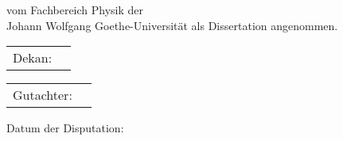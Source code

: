 \thispagestyle{empty}
\vspace*{0.5\textheight}

\noindent{}%
vom Fachbereich Physik der \\[2pt]
Johann Wolfgang Goethe-Universit\"at als Dissertation angenommen.

\vspace*{2cm}

\noindent{}%
\begin{tabular}{@{}l@{\hskip 1ex}l}
  Dekan:
\end{tabular}

\vspace*{1cm}

\noindent{}%
\begin{tabular}{@{}l@{\hskip 1ex}l}
  Gutachter: 
\end{tabular}

\vspace*{2cm}
\noindent{}%
Datum der Disputation:

